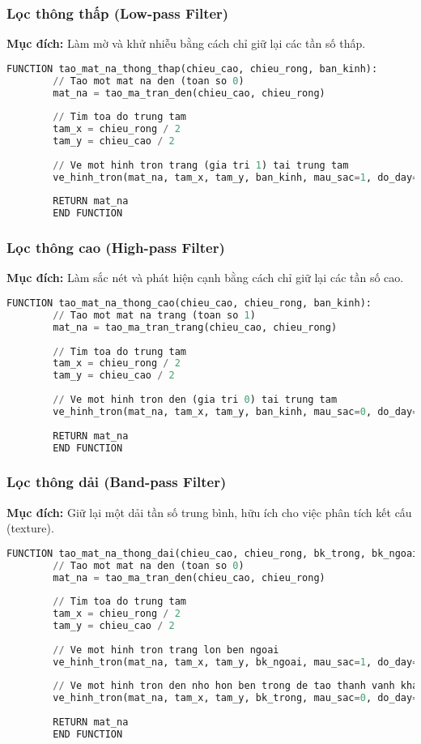 \documentclass[12pt, a4paper]{article}
\begin{document}
	\subsubsection{Lọc thông thấp (Low-pass Filter)}
	\textbf{Mục đích:} Làm mờ và khử nhiễu bằng cách chỉ giữ lại các tần số thấp.
	\begin{lstlisting}[language=Python, caption={Mã giả tạo mặt nạ Lọc thông thấp.}, label={lst:lpf}]
		FUNCTION tao_mat_na_thong_thap(chieu_cao, chieu_rong, ban_kinh):
		// Tao mot mat na den (toan so 0)
		mat_na = tao_ma_tran_den(chieu_cao, chieu_rong)
		
		// Tim toa do trung tam
		tam_x = chieu_rong / 2
		tam_y = chieu_cao / 2
		
		// Ve mot hinh tron trang (gia tri 1) tai trung tam
		ve_hinh_tron(mat_na, tam_x, tam_y, ban_kinh, mau_sac=1, do_day=-1)
		
		RETURN mat_na
		END FUNCTION
	\end{lstlisting}
	
	\subsubsection{Lọc thông cao (High-pass Filter)}
	\textbf{Mục đích:} Làm sắc nét và phát hiện cạnh bằng cách chỉ giữ lại các tần số cao.
	\begin{lstlisting}[language=Python, caption={Mã giả tạo mặt nạ Lọc thông cao.}, label={lst:hpf}]
		FUNCTION tao_mat_na_thong_cao(chieu_cao, chieu_rong, ban_kinh):
		// Tao mot mat na trang (toan so 1)
		mat_na = tao_ma_tran_trang(chieu_cao, chieu_rong)
		
		// Tim toa do trung tam
		tam_x = chieu_rong / 2
		tam_y = chieu_cao / 2
		
		// Ve mot hinh tron den (gia tri 0) tai trung tam
		ve_hinh_tron(mat_na, tam_x, tam_y, ban_kinh, mau_sac=0, do_day=-1)
		
		RETURN mat_na
		END FUNCTION
	\end{lstlisting}
	
	\subsubsection{Lọc thông dải (Band-pass Filter)}
	\textbf{Mục đích:} Giữ lại một dải tần số trung bình, hữu ích cho việc phân tích kết cấu (texture).
	\begin{lstlisting}[language=Python, caption={Mã giả tạo mặt nạ Lọc thông dải.}, label={lst:bpf}]
		FUNCTION tao_mat_na_thong_dai(chieu_cao, chieu_rong, bk_trong, bk_ngoai):
		// Tao mot mat na den (toan so 0)
		mat_na = tao_ma_tran_den(chieu_cao, chieu_rong)
		
		// Tim toa do trung tam
		tam_x = chieu_rong / 2
		tam_y = chieu_cao / 2
		
		// Ve mot hinh tron trang lon ben ngoai
		ve_hinh_tron(mat_na, tam_x, tam_y, bk_ngoai, mau_sac=1, do_day=-1)
		
		// Ve mot hinh tron den nho hon ben trong de tao thanh vanh khan
		ve_hinh_tron(mat_na, tam_x, tam_y, bk_trong, mau_sac=0, do_day=-1)
		
		RETURN mat_na
		END FUNCTION
	\end{lstlisting}
	
\end{document}
